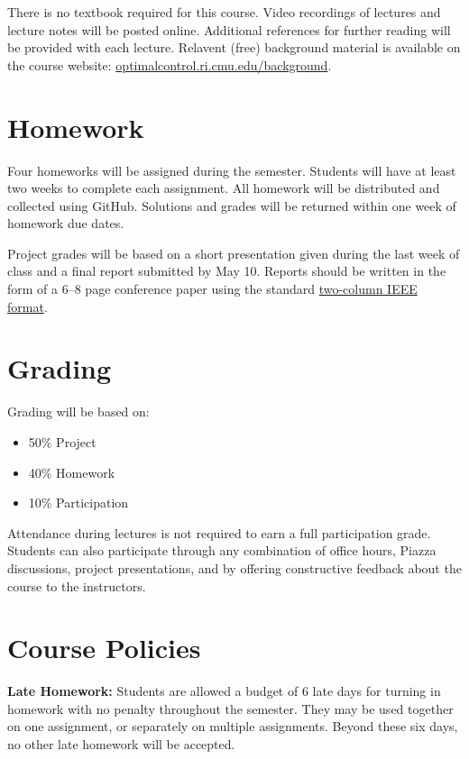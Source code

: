 \documentclass[11pt,letterpaper]{article}
\begin{document}
There is no textbook required for this course. Video recordings of lectures and lecture notes will be posted online. Additional references for further reading will be provided with each lecture. Relavent (free) background material is available on the course website: \href{https://optimalcontrol.ri.cmu.edu/background/}{optimalcontrol.ri.cmu.edu/background}.

\section*{Homework}

Four homeworks will be assigned during the semester. Students will have at least two weeks to complete each assignment. All homework will be distributed and collected using GitHub. Solutions and grades will be returned within one week of homework due dates.

\medskip
\noindent
Project grades will be based on a short presentation given during the last week of class and a final report submitted by May 10. Reports should be written in the form of a 6--8 page conference paper using the standard \href{https://www.ieee.org/conferences/publishing/templates.html}{two-column IEEE format}.

\section*{Grading}

Grading will be based on:
\begin{itemize}
	\item 50\% Project
	\item 40\% Homework
	\item 10\% Participation
\end{itemize}
Attendance during lectures is not required to earn a full participation grade. Students can also participate through any combination of office hours, Piazza discussions, project presentations, and by offering constructive feedback about the course to the instructors.


\section*{Course Policies}

\textbf{Late Homework:} Students are allowed a budget of 6 late days for turning in homework with no penalty throughout the semester. They may be used together on one assignment, or separately on multiple assignments. Beyond these six days, no other late homework will be accepted.
\end{document}
